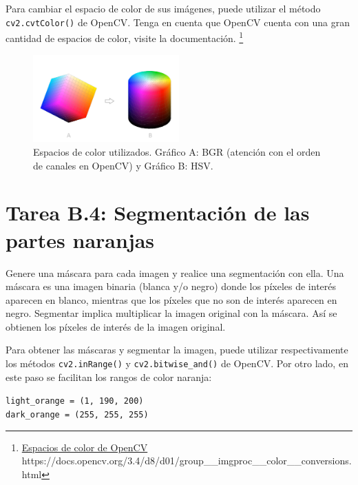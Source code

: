 Para cambiar el espacio de color de sus imágenes, puede utilizar el método \texttt{cv2.cvtColor()} de OpenCV. Tenga en cuenta que OpenCV cuenta con una gran cantidad de espacios de color, visite la documentación. \footnote{ \href{https://docs.opencv.org/3.4/d8/d01/group\_\_imgproc\_\_color\_\_conversions.html}{Espacios de color de OpenCV} https://docs.opencv.org/3.4/d8/d01/group\_\_imgproc\_\_color\_\_conversions.html}



\begin{figure}[h]
    \centering
    \includegraphics[width=0.5\textwidth]{Lab_1/template/figures/color_spaces.png}
    \caption{Espacios de color utilizados. Gráfico A: BGR (atención con el orden de canales en OpenCV) y Gráfico B: HSV.}
    
    \label{fig:color_spaces}
\end{figure}

\section*{Tarea B.4: Segmentación de las partes naranjas}

Genere una máscara para cada imagen y realice una segmentación con ella. Una máscara es una imagen binaria (blanca y/o negro) donde los píxeles de interés aparecen en blanco, mientras que los píxeles que no son de interés aparecen en negro. Segmentar implica multiplicar la imagen original con la máscara. Así se obtienen los píxeles de interés de la imagen original.

Para obtener las máscaras y segmentar la imagen, puede utilizar respectivamente los métodos \texttt{cv2.inRange()} y \texttt{cv2.bitwise\_and()} de OpenCV. Por otro lado, en este paso se facilitan los rangos de color naranja:

\begin{tcolorbox}[colback=gray!85, coltext=white, colframe=white, fonttitle=\bfseries, title=Important Note, boxrule=0.5mm]
\texttt{light\_orange = (1, 190, 200)}\\
\texttt{dark\_orange = (255, 255, 255)}
\end{tcolorbox}


